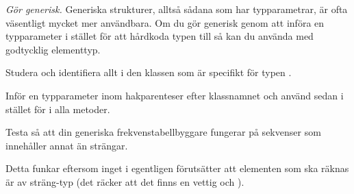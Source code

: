 \Task \emph{Gör  generisk.} Generiska strukturer, alltså sådana som har typparametrar, är ofta väsentligt mycket mer användbara. Om du gör  generisk genom att införa en typparameter i stället för att hårdkoda typen till  så kan du använda  med godtycklig elementtyp. 

\Subtask Studera  och identifiera allt i den klassen som är specifikt för typen .

\Subtask Inför en typparameter  inom hakparenteser efter klassnamnet och använd sedan  i stället för  i alla metoder.

\Subtask Testa så att din generiska frekvenstabellbyggare fungerar på sekvenser som innehåller annat än strängar.

Detta funkar eftersom inget i  egentligen förutsätter att elementen som ska räknas är av sträng-typ (det räcker att det finns en vettig  och ).
